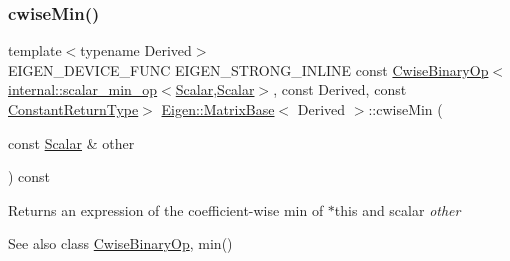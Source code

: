 \subsubsection{\texorpdfstring{cwiseMin()}{cwiseMin()}\hspace{0.1cm}{\footnotesize\ttfamily [2/2]}}
{\footnotesize\ttfamily template$<$typename Derived$>$ \\
E\+I\+G\+E\+N\+\_\+\+D\+E\+V\+I\+C\+E\+\_\+\+F\+U\+NC E\+I\+G\+E\+N\+\_\+\+S\+T\+R\+O\+N\+G\+\_\+\+I\+N\+L\+I\+NE const \mbox{\hyperlink{class_eigen_1_1_cwise_binary_op}{Cwise\+Binary\+Op}}$<$\mbox{\hyperlink{struct_eigen_1_1internal_1_1scalar__min__op}{internal\+::scalar\+\_\+min\+\_\+op}}$<$\mbox{\hyperlink{class_eigen_1_1_dense_base_a5feed465b3a8e60c47e73ecce83e39a2}{Scalar}},\mbox{\hyperlink{class_eigen_1_1_dense_base_a5feed465b3a8e60c47e73ecce83e39a2}{Scalar}}$>$, const Derived, const \mbox{\hyperlink{class_eigen_1_1_cwise_nullary_op}{Constant\+Return\+Type}}$>$ \mbox{\hyperlink{class_eigen_1_1_matrix_base}{Eigen\+::\+Matrix\+Base}}$<$ Derived $>$\+::cwise\+Min (\begin{DoxyParamCaption}\item[{const \mbox{\hyperlink{class_eigen_1_1_dense_base_a5feed465b3a8e60c47e73ecce83e39a2}{Scalar}} \&}]{other }\end{DoxyParamCaption}) const\hspace{0.3cm}{\ttfamily [inline]}}

\begin{DoxyReturn}{Returns}
an expression of the coefficient-\/wise min of $\ast$this and scalar {\itshape other} 
\end{DoxyReturn}
\begin{DoxySeeAlso}{See also}
class \mbox{\hyperlink{class_eigen_1_1_cwise_binary_op}{Cwise\+Binary\+Op}}, min() 
\end{DoxySeeAlso}
\mbox{\label{class_eigen_1_1_matrix_base_a78d22ea009bdb12a0988a1c2cb5252b2}} 
